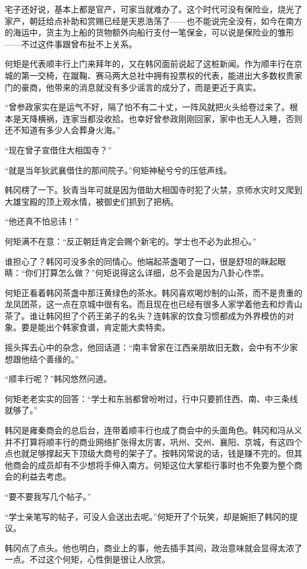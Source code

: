宅子还好说，基本上都是官产，可家当就难办了。这个时代可没有保险业，烧光了家产，朝廷给点补助和赏赐已经是天恩浩荡了——也不能说完全没有，如今在南方的海运中，货主为上船的货物额外向船行支付一笔保金，可以说是保险业的雏形——不过这件事跟曾布扯不上关系。

何矩是代表顺丰行上门来拜年的，又在韩冈面前说起了这桩新闻。作为顺丰行在京城的第一交椅，在蹴鞠、赛马两大总社中拥有投票权的代表，能进出大多数权贵家门的豪商，他带来的消息就没有多少谣言的成分了，而是更近于真实。

“曾参政家实在是运气不好，隔了怕不有二十丈，一阵风就把火头给卷过来了。根本是天降横祸，连家当都没收拾。也幸好曾参政刚刚回家，家中也无人入睡，否则还不知道有多少人会葬身火海。”

“现在曾子宣借住大相国寺？”

“就是当年狄武襄借住的那间院子。”何矩神秘兮兮的压低声线。

韩冈楞了一下。狄青当年可就是因为借助大相国寺时犯了火禁，京师水灾时又爬到大雄宝殿的顶上观水情，被御史们抓到了把柄。

“他还真不怕忌讳！”

何矩满不在意：“反正朝廷肯定会赐个新宅的。学士也不必为此担心。”

谁担心了？韩冈可没多余的同情心。他端起茶盏喝了一口，很是舒坦的眯起眼睛：“你们打算怎么做？”何矩说得这么详细，总不会是因为八卦心作祟。

何矩正看着韩冈茶盏中那汪黄绿色的茶水。韩冈喜欢喝炒制的山茶，而不是贵重的龙凤团茶，这一点在京城中很有名。而且现在也已经有很多人家学着他去和炒青山茶了。谁让韩冈担了个药王弟子的名头？连韩家的饮食习惯都成为外界模仿的对象。要是能出个韩家食谱，肯定能大卖特卖。

摇头挥去心中的杂念，他回话道：“南丰曾家在江西亲朋故旧无数，会中有不少家想跟他结个善缘的。”

“顺丰行呢？”韩冈悠然问道。

何矩老老实实的回答：“学士和东翁都曾吩咐过，行中只要抓住西、南、中三条线就够了。”

韩冈是雍秦商会的总后台，连带着顺丰行也成了商会中的头面角色。韩冈和冯从义并不打算将顺丰行的商业网络扩张得太厉害，巩州、交州、襄阳、京城，有这四个点也就足够撑起天下顶级大商号的架子了。按韩冈常说的话，钱是赚不完的。但其他商会的成员却有不少想将手伸入南方。何矩这位大掌柜行事时也不免要为整个商会的利益去考虑。

“要不要我写几个帖子。”

“学士亲笔写的帖子，可没人会送出去呢。”何矩开了个玩笑，却是婉拒了韩冈的提议。

韩冈点了点头。他也明白，商业上的事，他去插手其间，政治意味就会显得太浓了一点。不过这个何矩，心性倒是很让人欣赏。

